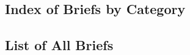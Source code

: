 \documentclass{article}
\begin{document}
\begin{multicols}{2}

\end{multicols}
\begin{center}
\section*{Index of Briefs by Category}
\end{center}
\begin{multicols}{2}
\noindent

\end{multicols}
\begin{center}
\section*{List of All Briefs}
\end{center}
\begin{multicols}{2}

\end{multicols}
\pagebreak
{}
\pagestyle{fancy}

\end{document}
